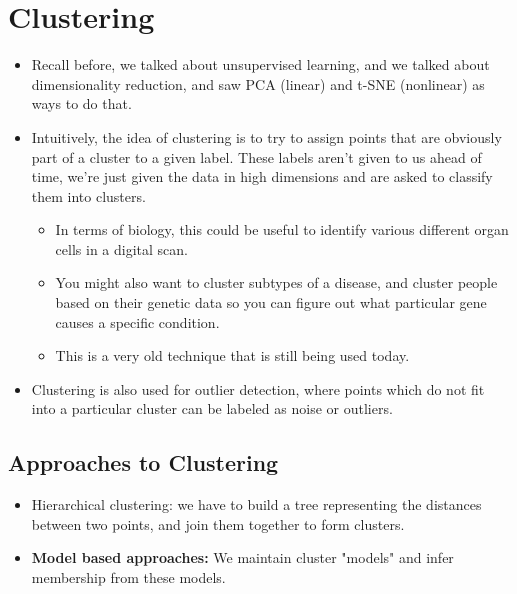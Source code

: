 \section{Clustering}
\begin{itemize}
	\item Recall before, we talked about unsupervised learning, and we talked about dimensionality reduction,
		and saw PCA (linear) and t-SNE (nonlinear) as ways to do that.
	\item Intuitively, the idea of clustering is to try to assign points that are obviously part of a cluster
		to a given label. These labels aren't given to us ahead of time, we're just given the data in high
		dimensions and are asked to classify them into clusters.   
		\begin{itemize}
			\item In terms of biology, this could be useful to identify various different organ cells in a
				digital scan. 
			\item You might also want to cluster subtypes of a disease, and cluster people based on their
				genetic data so you can figure out what particular gene causes a specific condition.
			\item This is a very old technique that is still being used today.   
		\end{itemize}
	\item Clustering is also used for outlier detection, where points which do not fit into a particular
		cluster can be labeled as noise or outliers.  
\end{itemize}
\subsection{Approaches to Clustering}
\begin{itemize}
	\item Hierarchical clustering: we have to build a tree representing the distances between two points, and
		join them together  to form clusters. 
	\item \textbf{Model based approaches:} We maintain cluster "models" and infer membership from these
		models.
\end{itemize}


